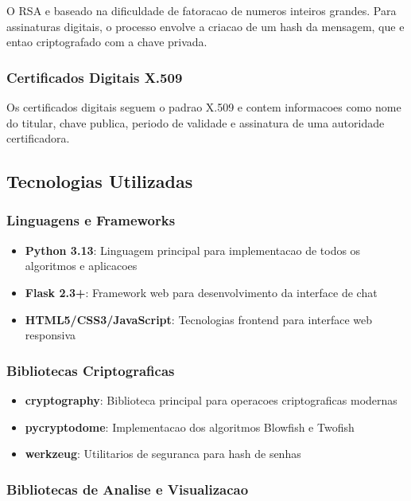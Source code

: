 \documentclass[12pt,a4paper,oneside]{article}
\begin{document}
O RSA e baseado na dificuldade de fatoracao de numeros inteiros grandes. Para assinaturas digitais, o processo envolve a criacao de um hash da mensagem, que e entao criptografado com a chave privada.

\subsubsection{Certificados Digitais X.509}

Os certificados digitais seguem o padrao X.509 e contem informacoes como nome do titular, chave publica, periodo de validade e assinatura de uma autoridade certificadora.

\subsection{Tecnologias Utilizadas}

\subsubsection{Linguagens e Frameworks}

\begin{itemize}
    \item \textbf{Python 3.13}: Linguagem principal para implementacao de todos os algoritmos e aplicacoes
    \item \textbf{Flask 2.3+}: Framework web para desenvolvimento da interface de chat
    \item \textbf{HTML5/CSS3/JavaScript}: Tecnologias frontend para interface web responsiva
\end{itemize}

\subsubsection{Bibliotecas Criptograficas}

\begin{itemize}
    \item \textbf{cryptography}: Biblioteca principal para operacoes criptograficas modernas
    \item \textbf{pycryptodome}: Implementacao dos algoritmos Blowfish e Twofish
    \item \textbf{werkzeug}: Utilitarios de seguranca para hash de senhas
\end{itemize}

\subsubsection{Bibliotecas de Analise e Visualizacao}
\end{document}
